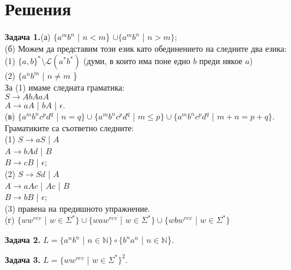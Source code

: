 \documentclass{article}
\begin{document}
\vspace{25pt}

\section{Решения}
    \textbf{Задача 1.}(а) $\{a^mb^n$ | $n < m$\} $\cup \{a^mb^n$ | $n > m\}$; \\
    (б) Можем да представим този език като обединението на следните два езика: \\
    (1) $\{a,b\}^* \setminus \mathscr{L}(a^*b^*)$ (думи, в които има поне едно $b$ преди някое $a$) \\
    (2) $\{a^nb^m$ | $n \neq m$ \}\\
    За (1) имаме следната граматика: \\
    \vspace{5pt}
    $S \rightarrow AbAaA$ \\
    $A \rightarrow aA$ | $bA$ | $\epsilon$. \\
    \vspace{5pt}
    (в) $\{a^mb^nc^pd^q$ | $n=q\} \cup \{a^mb^nc^pd^q$ | $m\leq p\} \cup \{a^mb^nc^pd^q$ | $m+n = p+q\}$.
    Граматиките са съответно следните: \\
    \vspace{5pt}
    (1) $S \rightarrow aS$ | $A$ \\
    $A \rightarrow bAd$ | $B$ \\
    $B \rightarrow cB$ | $\epsilon$; \\
    \vspace{5pt}
    (2) $S \rightarrow Sd$ | $A$ \\
    $A \rightarrow aAc$ | $Ac$ | $B$ \\
    $B \rightarrow bB$ | $\epsilon$; \\
    \vspace{5pt}
    (3) правена на предишното упражнение. \\
    (г) $\{ww^{rev}$ | $w \in \Sigma^*\} \cup \{waw^{rev}$ | $w \in \Sigma^*\} \cup \{wbw^{rev}$ | $w \in \Sigma^*\}$

    \vspace{15pt}

    \textbf{Задача 2.} $L = \{a^nb^n$ | $n \in \mathbb{N}\} \circ \{b^na^n$ | $n \in \mathbb{N}$\}.

    \vspace{15pt}

    \textbf{Задача 3.} $L = \{ww^{rev}$ | $w \in \Sigma^*\}^2$. 

    \vspace{15pt}
\end{document}
